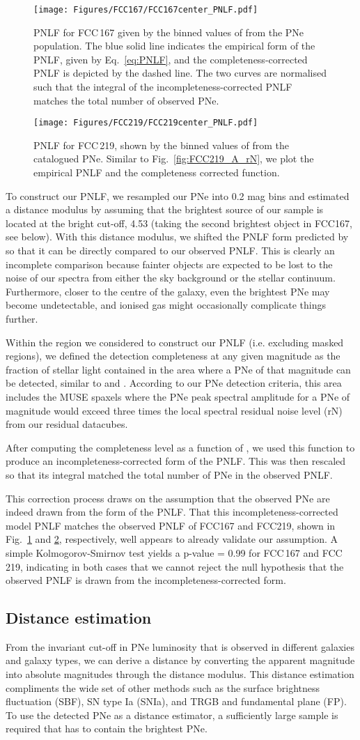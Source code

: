 \documentclass{aa}
\newcommand{\placefigPNLFa}{
    \begin{figure}
    \centering
    \texttt{[image: Figures/FCC167/FCC167center\_PNLF.pdf]}
    \caption{PNLF for FCC\,167 given by the binned values of  from the PNe population. The blue solid line indicates the empirical form of the PNLF, given by Eq.~\ref{eq:PNLF}, and the completeness-corrected PNLF 
    is depicted by the dashed line. The two curves are normalised such that the integral of the incompleteness-corrected PNLF matches the total number of observed PNe.}
    \label{fig:FCC167_PNLF}
    \end{figure}
}
\newcommand{\placefigPNLFb}{
    \begin{figure}
    \centering
    \texttt{[image: Figures/FCC219/FCC219center\_PNLF.pdf]}
    \caption{PNLF for FCC\,219, shown by the binned values of  from the catalogued PNe. Similar to Fig.~\ref{fig:FCC219_A_rN}, we plot the empirical PNLF and the completeness corrected function.}
    \label{fig:FCC219_PNLF}
    \end{figure}
}
\begin{document}
\placefigPNLFa
\placefigPNLFb


To construct our PNLF, we resampled our PNe into 0.2 mag bins and estimated a distance modulus by assuming that the brightest source of our sample is located at the bright cut-off, 4.53 (taking the second brightest object in FCC167, see below). With this distance modulus, we shifted the PNLF form predicted by \citet{ciardullo_planetary_1989}  so that it can be directly compared to our observed PNLF. This is clearly an incomplete comparison because fainter objects are expected to be lost to the noise of our spectra from either the sky background or the stellar continuum. Furthermore, closer to the centre of the galaxy, even the brightest PNe may become undetectable, and ionised gas might occasionally complicate things further.


Within the region we considered to construct our PNLF (i.e. excluding masked regions), we defined the detection completeness at any given  magnitude as the fraction of stellar light contained in the area where a PNe of that magnitude can be detected, similar to \citet{sarzi_planetary_2011} and \citet{pastorello_planetary_2013}. According to our PNe detection criteria, this area includes the MUSE spaxels where the PNe peak spectral  amplitude for a PNe of  magnitude would exceed three times the local spectral residual noise level (rN) from our residual datacubes.


After computing the completeness level as a function of  , we used this function to produce an incompleteness-corrected \citet{ciardullo_planetary_1989} form of the PNLF. This was then rescaled so that its integral matched the total number of PNe in the observed PNLF.

This correction process draws on the assumption that the observed PNe are indeed drawn from the \citet{ciardullo_planetary_1989} form of the PNLF. That this incompleteness-corrected model PNLF matches the observed PNLF of FCC167 and FCC219, shown in Fig.~\ref{fig:FCC167_PNLF} and \ref{fig:FCC219_PNLF}, respectively, well appears to already validate our assumption. A simple Kolmogorov-Smirnov test yields a p-value = 0.99 for FCC\,167 and FCC\,219, indicating in both cases that we cannot reject the null hypothesis that the observed PNLF is drawn from the incompleteness-corrected \citet{ciardullo_planetary_1989} form. 

\subsection{Distance estimation}
From the invariant cut-off in PNe luminosity that is observed in different galaxies and galaxy types, we can derive a distance by converting the apparent magnitude into absolute magnitudes through the distance modulus. This distance estimation compliments the wide set of other methods such as the surface brightness fluctuation (SBF), SN type Ia (SNIa), and TRGB and fundamental plane (FP). To use the detected PNe as a distance estimator, a sufficiently large sample is required that has to contain the brightest PNe.
\end{document}
